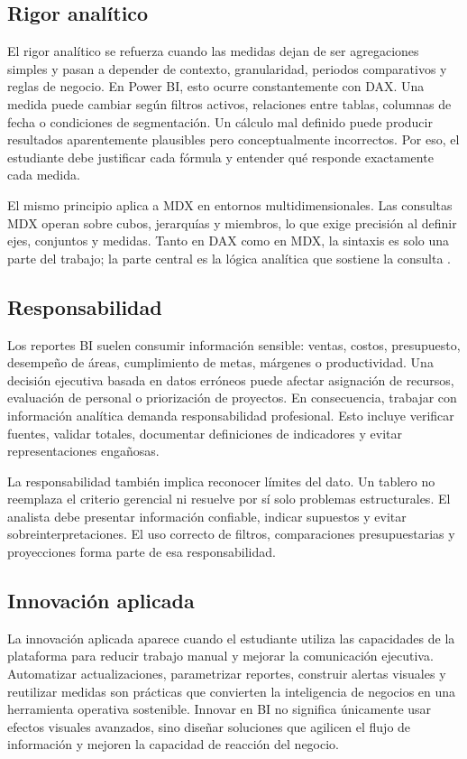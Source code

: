 \documentclass[12pt]{article}
\begin{document}
\subsection{Rigor analítico}
El rigor analítico se refuerza cuando las medidas dejan de ser agregaciones simples y pasan a depender de contexto, granularidad, periodos comparativos y reglas de negocio. En Power BI, esto ocurre constantemente con DAX. Una medida puede cambiar según filtros activos, relaciones entre tablas, columnas de fecha o condiciones de segmentación. Un cálculo mal definido puede producir resultados aparentemente plausibles pero conceptualmente incorrectos. Por eso, el estudiante debe justificar cada fórmula y entender qué responde exactamente cada medida.

El mismo principio aplica a MDX en entornos multidimensionales. Las consultas MDX operan sobre cubos, jerarquías y miembros, lo que exige precisión al definir ejes, conjuntos y medidas. Tanto en DAX como en MDX, la sintaxis es solo una parte del trabajo; la parte central es la lógica analítica que sostiene la consulta \cite{ms_dax_overview,ms_mdx_basic_query}.

\subsection{Responsabilidad}
Los reportes BI suelen consumir información sensible: ventas, costos, presupuesto, desempeño de áreas, cumplimiento de metas, márgenes o productividad. Una decisión ejecutiva basada en datos erróneos puede afectar asignación de recursos, evaluación de personal o priorización de proyectos. En consecuencia, trabajar con información analítica demanda responsabilidad profesional. Esto incluye verificar fuentes, validar totales, documentar definiciones de indicadores y evitar representaciones engañosas.

La responsabilidad también implica reconocer límites del dato. Un tablero no reemplaza el criterio gerencial ni resuelve por sí solo problemas estructurales. El analista debe presentar información confiable, indicar supuestos y evitar sobreinterpretaciones. El uso correcto de filtros, comparaciones presupuestarias y proyecciones forma parte de esa responsabilidad.

\subsection{Innovación aplicada}
La innovación aplicada aparece cuando el estudiante utiliza las capacidades de la plataforma para reducir trabajo manual y mejorar la comunicación ejecutiva. Automatizar actualizaciones, parametrizar reportes, construir alertas visuales y reutilizar medidas son prácticas que convierten la inteligencia de negocios en una herramienta operativa sostenible. Innovar en BI no significa únicamente usar efectos visuales avanzados, sino diseñar soluciones que agilicen el flujo de información y mejoren la capacidad de reacción del negocio.
\end{document}

